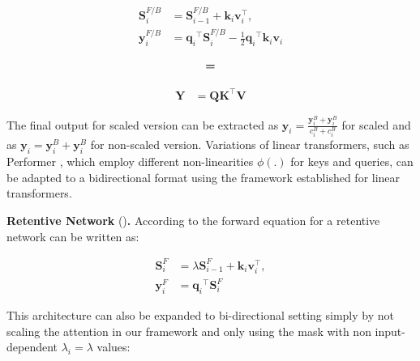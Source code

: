 \begin{minipage}[t]{0.45\textwidth}
\begin{whitebox}
    \begin{align}
        \mathbf{S}^{F/B}_i &= \mathbf{S}^{F/B}_{i-1} + \mathbf{k}_i \mathbf{v}_i^{\top}, \\
    \mathbf{y}^{F/B}_i &= {{{\mathbf{q}_i}}^{\top} \mathbf{S}^{F/B}_i}  - \frac{1}{2}{{\mathbf{q}_i}}^{\top} \mathbf{k}_i \mathbf{v}_i 
    \end{align}
\end{whitebox}
\end{minipage}
\begin{minipage}[t]{0.1\textwidth}
\vspace{-1.5cm}
    \begin{align}
       \textbf{=} \notag
    \end{align}
\end{minipage}
\begin{minipage}[t]{0.4\textwidth}
\vspace{-1.5cm}
\begin{whitebox}
    \begin{align}
        \mathbf{Y} &= \mathbf{Q}\mathbf{K}^{\top}\mathbf{V}
    \end{align}
\end{whitebox}
\end{minipage}

The final output for scaled version can be extracted as $\mathbf{y}_i = \frac{\mathbf{y}^{B}_i + \mathbf{y}^{B}_i}{c^B_i + c^B_i }$ for scaled and as $\mathbf{y}_i = {\mathbf{y}^{B}_i + \mathbf{y}^{B}_i}$ for non-scaled version. Variations of linear transformers, such as Performer \citep{performer}, which employ different non-linearities \(\phi(.)\) for keys and queries, can be adapted to a bidirectional format using the framework established for linear transformers.


\textbf{Retentive Network} (\lionretnet)\textbf{.} According to \cite{retnet} the forward equation for a retentive network can be written as:

\begin{align}
\label{eq:recurscale}
     \mathbf{S}_i^F &=  \lambda \mathbf{S}_{i-1}^F + \mathbf{k}_i \mathbf{v}_i^{\top}, \\
    \mathbf{y}_i^F &= {{{\mathbf{q}_i}}^{\top}  \mathbf{S}_i^F}
\end{align}

This architecture can also be expanded to bi-directional setting simply by not scaling the attention in our framework and only using the mask with non input-dependent $\lambda_i=\lambda$ values:

